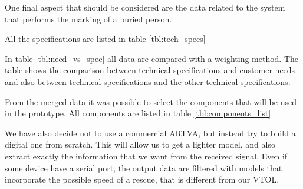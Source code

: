 One final aspect that should be considered are the data related to the system that performs the marking of a buried person.

All the specifications are listed in table \ref{tbl:tech_specs}


In table \ref{tbl:need_vs_spec} all data are compared with a weighting method. The table shows the comparison between technical specifications and customer needs and also between technical specifications and the other technical specifications.

From the merged data it was possible to select the components that will be used in the prototype. All components are listed in table \ref{tbl:components_list}

We have also decide not to use a commercial ARTVA, but instead try to build a digital one from scratch. This will allow us to get a lighter model, and also extract exactly the information that we want from the received signal. Even if some device have a serial port, the output data are filtered with models that incorporate the possible speed of a rescue, that is different from our VTOL.




\FloatBarrier

